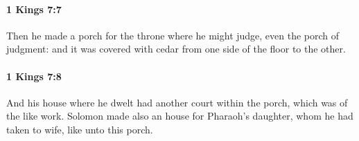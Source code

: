 		\paragraph{1 Kings 7:7} %
			\label{1KINGS-7-7}

			Then he made a porch for the throne where he might judge, even the porch of judgment: and it was covered with cedar from one side of the floor to the other.


		\paragraph{1 Kings 7:8} %
			\label{1KINGS-7-8}

			And his house where he dwelt had another court within the porch, which was of the like work. Solomon made also an house for Pharaoh’s daughter, whom he had taken to wife, like unto this porch.


